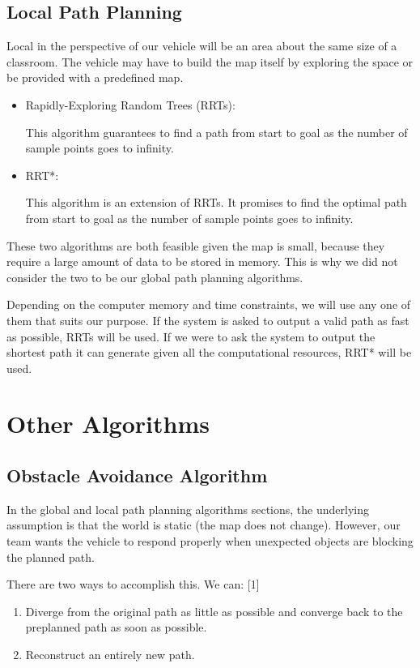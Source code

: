 \documentclass[compsoc,draftclsnofoot,onecolumn,10pt]{IEEEtran}
\begin{document}
\subsection{Local Path Planning}
Local in the perspective of our vehicle will be an area about the same size of a 
classroom. The vehicle may have to build the map itself by exploring the space or 
be provided with a predefined map.\par
\begin{itemize}
\item Rapidly-Exploring Random Trees (RRTs):\par
This algorithm guarantees to find a path from start to goal as the number of 
sample points goes to infinity.
\item RRT*:\par
This algorithm is an extension of RRTs. It promises to find the optimal path from 
start to goal as the number of sample points goes to infinity. 
\end{itemize}
These two algorithms are both feasible given the map is small, because they require 
a large amount of data to be stored in memory. This is why we did not consider the 
two to be our global path planning algorithms.\par

Depending on the computer memory and time constraints, we will use any one of them 
that suits our purpose. If the system is asked to output a valid path as fast as 
possible, RRTs will be used. If we were to ask the system to output the shortest path 
it can generate given all the computational resources, RRT* will be used.\par

\section{Other Algorithms}
\subsection{Obstacle Avoidance Algorithm}
In the global and local path planning algorithms sections, the underlying assumption 
is that the world is static (the map does not change). However, our team wants the 
vehicle to respond properly when unexpected objects are blocking the planned path.\par 

There are two ways to accomplish this. We can: [1]\par
\begin{enumerate}
\item Diverge from the original path as little as possible and converge back to 
the preplanned path as soon as possible.
\item Reconstruct an entirely new path.
\end{enumerate}
\end{document}
